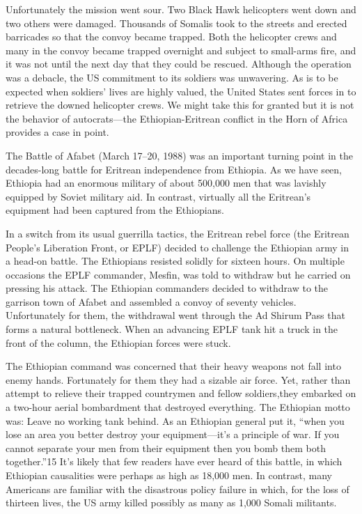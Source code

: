 \documentclass[10pt]{article}
\begin{document}
{\large Unfortunately the mission went sour. Two Black Hawk helicopters went
down and two others were damaged. Thousands of Somalis took to the streets and
erected barricades so that the convoy became trapped. Both the helicopter crews
and many in the convoy became trapped overnight and subject to small-arms fire,
and it was not until the next day that they could be rescued. Although the
operation was a debacle, the US commitment to its soldiers was unwavering. As is
to be expected when soldiers' lives are highly valued, the United States sent
forces in to retrieve the downed helicopter crews. We might take this for granted
but it is not the behavior of autocrats---the Ethiopian-Eritrean conflict in the
Horn of Africa provides a case in point.}

{\large The Battle of Afabet (March 17--20, 1988) was an important turning point
in the decades-long battle for Eritrean independence from Ethiopia. As we have
seen, Ethiopia had an enormous military of about 500,000 men that was lavishly
equipped by Soviet military aid. In contrast, virtually all the Eritrean's
equipment had been captured from the Ethiopians.}

{\large In a switch from its usual guerrilla tactics, the Eritrean rebel force
(the Eritrean People's Liberation Front, or EPLF) decided to challenge the
Ethiopian army in a head-on battle. The Ethiopians resisted solidly for sixteen
hours. On multiple occasions the EPLF commander, Mesfin, was told to withdraw but
he carried on pressing his attack. The Ethiopian commanders decided to withdraw
to the garrison town of Afabet and assembled a convoy of seventy vehicles.
Unfortunately for them, the withdrawal went through the Ad Shirum Pass that forms
a natural bottleneck. When an advancing EPLF tank hit a truck in the front of the
column, the Ethiopian forces were stuck.}

{\large The Ethiopian command was concerned that their heavy weapons not fall
into enemy hands. Fortunately for them they had a sizable air force. Yet, rather
than attempt to relieve their trapped countrymen and fellow soldiers,they
embarked on a two-hour aerial bombardment that destroyed everything. The
Ethiopian motto was: Leave no working tank behind. As an Ethiopian general put
it, ``when you lose an area you better destroy your equipment---it's a principle
of war. If you cannot separate your men from their equipment then you bomb them
both together.''15 It's likely that few readers have ever heard of this battle,
in which Ethiopian causalities were perhaps as high as 18,000 men. In contrast,
many Americans are familiar with the disastrous policy failure in which, for the
loss of thirteen lives, the US army killed possibly as many as 1,000 Somali
militants.}
\end{document}
